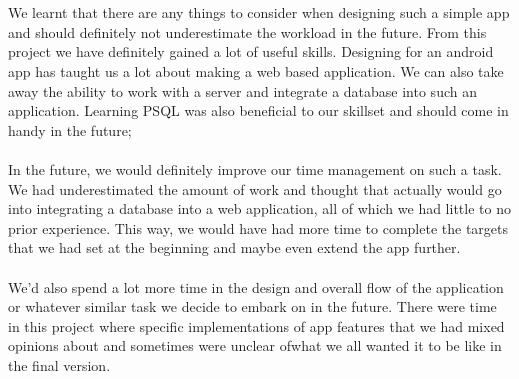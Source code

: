 \documentclass[a4paper,11pt]{article}
\begin{document}
\\
\\ We learnt that there are any things to consider when designing such a simple app and should definitely not underestimate the workload in the future. 
From this project we have definitely gained a lot of useful skills. Designing for an android app has taught us a lot about making a web based application. We can also take away the ability to work with a server and integrate a database into such an application. Learning PSQL was also beneficial to our skillset and should come in handy in the future; 
\\
\\In the future, we would definitely improve our time management on such a task. We had underestimated the amount of work and thought that actually would go into integrating a database into a web application, all of which we had little to no prior experience.
This way, we would have had more time to complete the targets that we had set at the beginning and maybe even extend the app further.
\\
\\ 
We'd also spend a lot more time in the design and overall flow of the application or whatever similar task we decide to embark on in the future. There were time in this project where specific implementations of app features that we had mixed opinions about and sometimes were unclear ofwhat we all wanted it to be like in the final version.
\end{document}
